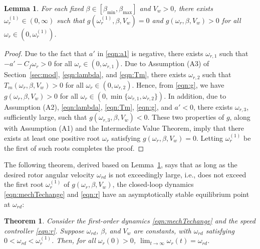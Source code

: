 \documentclass[journal]{IEEEtran}
\newtheorem{lemma}{Lemma}
\newtheorem{theorem}{Theorem}
\begin{document}
\begin{lemma}\label{lemma:omegar1}
For each fixed $\beta\in[\beta_{\min}, \beta_{\max}]$ and $V_w>0$, there exists $\omega_r^{(1)}\in(0, \infty)$ such that $g(\omega_r^{(1)},\beta,V_w)=0$ and $g(\omega_r,\beta,V_w)>0$ for all $\omega_r\in(0,\omega_r^{(1)})$.
\end{lemma}

\begin{proof}
Due to the fact that $a'$ in \eqref{eqn:a1} is negative, there exists $\omega_{r,1}$ such that $-a'-C_f\omega_r>0$ for all $\omega_r\in(0, \omega_{r,1})$. Due to Assumption (A3) of Section~\ref{sec:mod}, \eqref{eqn:lambda}, and \eqref{eqn:Tm}, there exists $\omega_{r,2}$ such that $T_m(\omega_r, \beta, V_w)>0$ for all $\omega_r\in(0, \omega_{r,2})$. Hence, from \eqref{eqn:g}, we have $g(\omega_r, \beta, V_w)>0$ for all $\omega_r\in(0, \min\{\omega_{r,1}, \omega_{r,2}\})$. In addition, due to Assumption (A2), \eqref{eqn:lambda}, \eqref{eqn:Tm}, \eqref{eqn:g}, and $a'<0$, there exists $\omega_{r,3}$, sufficiently large, such that $g(\omega_{r,3}, \beta, V_w)<0$. These two properties of $g$, along with Assumption (A1) and the Intermediate Value Theorem, imply that there exists at least one positive root $\omega_r$ satisfying $g(\omega_r, \beta, V_w)=0$. Letting $\omega_r^{(1)}$ be the first of such roots completes the proof.
\end{proof}

The following theorem, derived based on Lemma~\ref{lemma:omegar1}, says that as long as the desired rotor angular velocity $\omega_{rd}$ is not exceedingly large, i.e., does not exceed the first root $\omega_r^{(1)}$ of $g(\omega_r, \beta, V_w)$, the closed-loop dynamics \eqref{eqn:mechTechange} and \eqref{eqn:r} have an asymptotically stable equilibrium point at $\omega_{rd}$:

\begin{theorem} \label{thm:speedctrl} Consider the first-order dynamics \eqref{eqn:mechTechange} and the speed controller \eqref{eqn:r}. Suppose $\omega_{rd}$, $\beta$, and $V_w$ are constants, with $\omega_{rd}$ satisfying $0<\omega_{rd}<\omega_r^{(1)}$. Then, for all $\omega_r(0)>0$, $\lim_{t \rightarrow \infty}\omega_r(t)=\omega_{rd}$.
\end{theorem}
\end{document}
